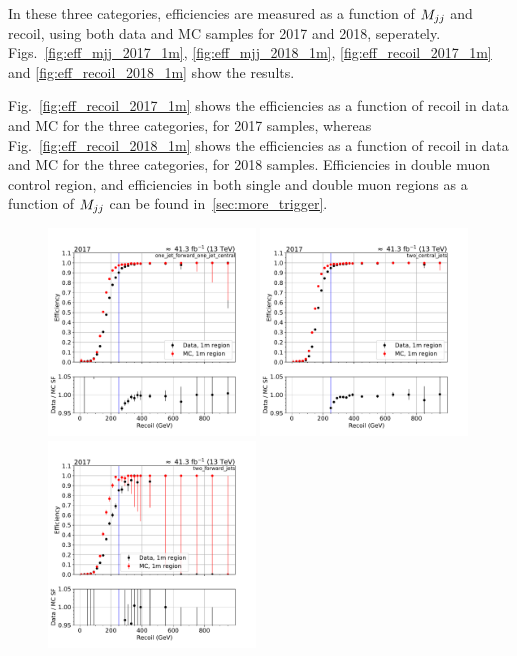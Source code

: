In these three categories, efficiencies are measured as a function of $M_{jj}$ and recoil, using both data and MC samples for 2017 and 2018,
seperately. Figs.~\ref{fig:eff_mjj_2017_1m}, \ref{fig:eff_mjj_2018_1m}, \ref{fig:eff_recoil_2017_1m} and \ref{fig:eff_recoil_2018_1m} show 
the results. 

Fig.~\ref{fig:eff_recoil_2017_1m} shows the efficiencies as a function of recoil in data and MC for the three categories, 
for 2017 samples, whereas Fig.~\ref{fig:eff_recoil_2018_1m} shows the efficiencies as a function of recoil in data and MC 
for the three categories, for 2018 samples. Efficiencies in double muon control region, and efficiencies in both single and double
muon regions as a function of $M_{jj}$ can be found in~\ref{sec:more_trigger}.

\begin{figure}[htp]
    \begin{center}
        \includegraphics[width=0.49\textwidth]{fig/efficiency/trigger/met/recoil/data_mc_comparison_1m_2017_one_jet_forward_one_jet_central.pdf}
        \includegraphics[width=0.49\textwidth]{fig/efficiency/trigger/met/recoil/data_mc_comparison_1m_2017_two_central_jets.pdf} \\
        \includegraphics[width=0.49\textwidth]{fig/efficiency/trigger/met/recoil/data_mc_comparison_1m_2017_two_forward_jets.pdf}

\end{center}
\end{figure}
